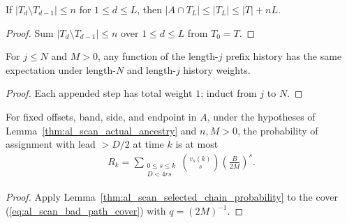 \begin{lemma}
    \label{thm:al_scan_compact_collar_card}
    \leanok
    If $|T_d\setminus T_{d-1}|\le n$ for $1\le d\le L$, then
    $|A\cap T_L|\le |T_L|\le |T|+nL$.
\end{lemma}
\begin{proof}\leanok
    Sum $|T_d\setminus T_{d-1}|\le n$ over $1\le d\le L$ from $T_0=T$.
\end{proof}

\begin{lemma}
    \label{thm:al_scan_prefix_marginal}
    \leanok
    For $j\le N$ and $M>0$, any function of the length-$j$ prefix history has the same expectation under length-$N$ and length-$j$ history weights.
\end{lemma}
\begin{proof}\leanok
    Each appended step has total weight $1$; induct from $j$ to $N$.
\end{proof}

\begin{lemma}
    \label{thm:al_scan_bad_endpoint_probability}
    \leanok
    For fixed offsets, band, side, and endpoint in $A$, under the hypotheses of Lemma~\ref{thm:al_scan_actual_ancestry} and $n,M>0$, the probability of assignment with lead $>D/2$ at time $k$ is at most
    \begin{align}
        R_k=\sum_{\substack{0\le s\le k \\D<4rs}}
        \binom{v_s(k)}s\left(\frac{B}{2M}\right)^s.
        \label{eq:al_scan_bad_endpoint_tail}
    \end{align}
\end{lemma}
\begin{proof}\leanok
    Apply Lemma~\ref{thm:al_scan_selected_chain_probability} to the cover (\ref{eq:al_scan_bad_path_cover}) with $q=(2M)^{-1}$.
\end{proof}

